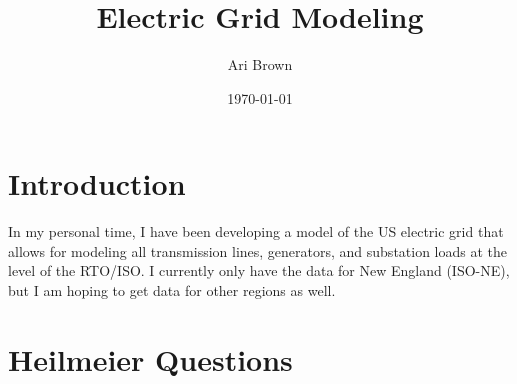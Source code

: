 \documentclass{article}
\title{Electric Grid Modeling}
\author{Ari Brown}
\date{\today}
\begin{document}
\maketitle

\section{Introduction}
In my personal time, I have been developing a model of the US electric grid that
allows for modeling all transmission lines, generators, and substation loads at
the level of the RTO/ISO. I currently only have the data for New England
(ISO-NE), but I am hoping to get data for other regions as well.

\section{Heilmeier Questions}
\end{document}
